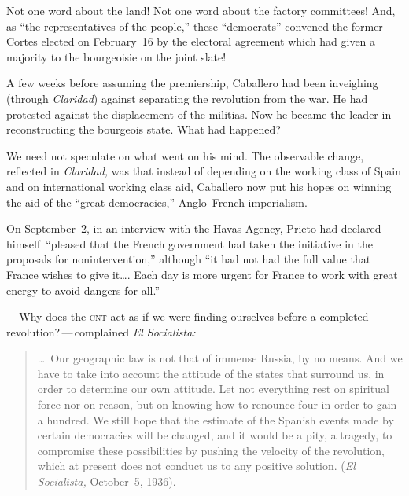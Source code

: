 Not one word about the land! Not one word about the factory committees! And, as ``the representatives of the people,'' these ``demo\-crats'' convened the former Cortes elected on February~16 by the electoral agreement which had given a majority to the bourgeoisie on the joint slate!

A few weeks before assuming the premiership, Caballero had been inveighing (through \emph{Claridad}\kern 1pt) against separating the revolution from the war. He had protested against the displacement of the militias. Now he became the leader in reconstructing the bourgeois state. What had happened?

We need not speculate on what went on his mind. The observable change, reflected in \emph{Claridad,} was that instead of depending on the working class of Spain and on international working class aid, Caballero now put his hopes on winning the aid of the ``great democracies,'' Anglo--French imperialism.

On September~2, in an interview with the Havas Agency, Prieto had declared himself\kern 1pt\ ``pleased that the French government had taken the initiative in the proposals for nonintervention,'' although ``it had not had the full value that France wishes to give it\dots. Each day is more urgent for France to work with great energy to avoid dangers for all.''

—\,Why does the \textsc{cnt} act as if we were finding ourselves before a completed revolution?\,—\,complained \emph{El Socialista:}

\begin{quotation}
  \noindent
  \dots\ Our geographic law is not that of immense Russia, by no means. And we have to take into account the attitude of the states that surround us, in order to determine our own attitude. Let not everything rest on spiritual force nor on reason, but on knowing how to renounce four in order to gain a hundred. We still hope that the estimate of the Spanish events made by certain democracies will be changed, and it would be a pity, a tragedy, to compromise these possibilities by pushing the velocity of the revolution, which at present does not conduct us to any positive solution. (\emph{El Socialista,} October~5, 1936).
\end{quotation}


